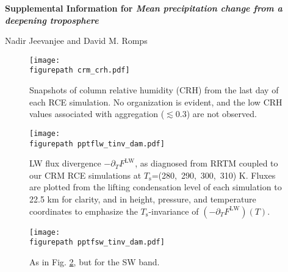 \documentclass[11pt]{article}
\newcommand{\jump}{\vspace{0.5cm}}
\newcommand{\ppt}{\ensuremath{\partial_T}}
\newcommand{\FLW}{\ensuremath{F^\mathrm{LW}}}
\newcommand{\Ts}{\ensuremath{T_\mathrm{s}}}
\newcommand{\figurepath}{../../../figures/}
\begin{document}
\begin{center}
 \Large{ \bf  Supplemental Information for \emph{Mean precipitation change from a deepening troposphere} }

\jump
\large{Nadir Jeevanjee and David M. Romps}
\end{center}






\pagebreak  
 
 
 \pagebreak 
\begin{figure}[h]
        \begin{center}
                        \texttt{[image: \\figurepath crm\_crh.pdf]}
		\caption{Snapshots  of column relative humidity (CRH) from the last day of each RCE simulation. No organization is evident, and the low CRH values associated with aggregation ($\lesssim 0.3$) are not observed. 
		\label{crm_crh}                
		}
        \end{center}
\end{figure}

\begin{figure}[h]
        \begin{center}
                        \texttt{[image: \\figurepath pptflw\_tinv\_dam.pdf]}
		\caption{LW flux divergence  $-\ppt \FLW$, as diagnosed from RRTM coupled to our CRM RCE simulations at \Ts=(280,\ 290,\ 300,\ 310) K. Fluxes are plotted from the lifting condensation level of each simulation to 22.5 km for clarity, and  in height, pressure, and temperature coordinates to emphasize the \Ts-invariance of  $(-\ppt \FLW)(T)$. 
		\label{pptflw_tinv_dam}                
		}
        \end{center}
\end{figure}

\begin{figure}[h]
        \begin{center}
                        \texttt{[image: \\figurepath pptfsw\_tinv\_dam.pdf]}
		\caption{As in  Fig. \ref{pptflw_tinv_dam}, but for the SW band.
		\label{pptfsw_tinv_dam}                
		}
        \end{center}
\end{figure}
\end{document}
